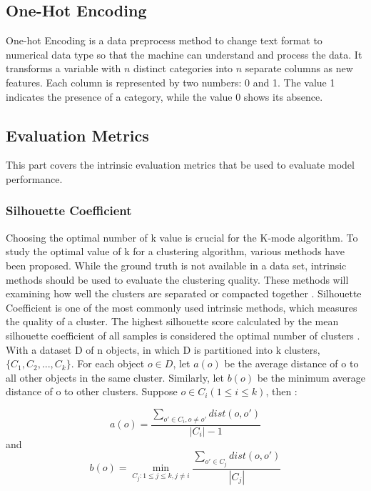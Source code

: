 \documentclass[12pt]{article}
\begin{document}
\subsection{One-Hot Encoding}\label{one-hot-enc}
One-hot Encoding is a data preprocess method to change text format to numerical data type so that the machine can understand and process the data. It transforms a variable with $n$ distinct categories into $n$ separate columns as new features. Each column is represented by two numbers: 0 and 1. The value 1 indicates the presence of a category, while the value 0 shows its absence.\citep{thuy2020optimize}

\subsection{Evaluation Metrics} \label{evaluation metrics}
This part covers the intrinsic evaluation metrics that be used to evaluate model performance.

\subsubsection{Silhouette Coefficient}

\noindent Choosing the optimal number of k value is crucial for the 
K-mode algorithm. To study the optimal value of k for a clustering algorithm, 
various methods have been proposed. While the ground truth is not available
in a data set, intrinsic methods should be used to evaluate the 
clustering quality. These methods will examining how well the clusters
are separated or compacted together \citep{2012vi}. Silhouette Coefficient is one of the most
commonly used intrinsic methods, which measures the quality of a cluster. The highest
silhouette score calculated by the mean silhouette coefficient of all samples
is considered the optimal number of clusters \citep{9260048}. \\

\noindent With a dataset D of n objects, in which D is partitioned into 
k clusters, $\{C_1,C_2,...,C_k\}$. For each object $o \in D$, 
let $a(o)$ be the average distance of o to all other objects in the same cluster.
Similarly, let $b(o)$ be the minimum average distance of o to other clusters.
Suppose $o \in C_i(1 \leq i \leq k )$, then \citep{2012vi}: 

$$a(o) = \frac{\sum_{o' \in C_i , o \neq o'} dist(o,o')}{|C_i| - 1}$$
and
$$b(o) = \min_{C_j: 1 \leq j \leq k, j \neq i} \frac{\sum_{o' \in C_j} dist(o,o')}{|C_j|}$$
\end{document}
